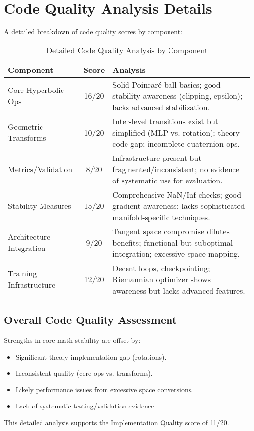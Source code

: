 \documentclass[11pt]{article}
\begin{document}
\section{Code Quality Analysis Details}
\label{app:code_quality}

A detailed breakdown of code quality scores by component:

\begin{table}[H] %
\centering
\caption{Detailed Code Quality Analysis by Component}
\label{tab:code_quality_appendix} %
\begin{tabular}{@{}lcp{9cm}@{}}
\toprule
\textbf{Component} & \textbf{Score} & \textbf{Analysis} \\
\midrule
Core Hyperbolic Ops & 16/20 & Solid Poincaré ball basics; good stability awareness (clipping, epsilon); lacks advanced stabilization. \\
Geometric Transforms & 10/20 & Inter-level transitions exist but simplified (MLP vs. rotation); theory-code gap; incomplete quaternion ops. \\
Metrics/Validation & 8/20 & Infrastructure present but fragmented/inconsistent; no evidence of systematic use for evaluation. \\
Stability Measures & 15/20 & Comprehensive NaN/Inf checks; good gradient awareness; lacks sophisticated manifold-specific techniques. \\
Architecture Integration & 9/20 & Tangent space compromise dilutes benefits; functional but suboptimal integration; excessive space mapping. \\
Training Infrastructure & 12/20 & Decent loops, checkpointing; Riemannian optimizer shows awareness but lacks advanced features. \\
\bottomrule
\end{tabular}
\end{table}

\subsection*{Overall Code Quality Assessment}
Strengths in core math stability are offset by:
\begin{itemize}[noitemsep]
    \item Significant theory-implementation gap (rotations).
    \item Inconsistent quality (core ops vs. transforms).
    \item Likely performance issues from excessive space conversions.
    \item Lack of systematic testing/validation evidence.
\end{itemize}
This detailed analysis supports the Implementation Quality score of 11/20.
\end{document}
